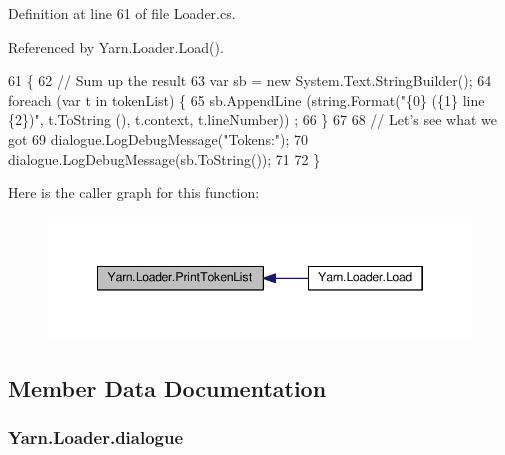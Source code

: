 Definition at line 61 of file Loader.\-cs.



Referenced by Yarn.\-Loader.\-Load().


\begin{DoxyCode}
61                                                           \{
62             \textcolor{comment}{// Sum up the result}
63             var sb = \textcolor{keyword}{new} System.Text.StringBuilder();
64             \textcolor{keywordflow}{foreach} (var t \textcolor{keywordflow}{in} tokenList) \{
65                 sb.AppendLine (string.Format(\textcolor{stringliteral}{"\{0\} (\{1\} line \{2\})"}, t.ToString (), t.context, t.lineNumber))
      ;
66             \}
67 
68             \textcolor{comment}{// Let's see what we got}
69             dialogue.LogDebugMessage(\textcolor{stringliteral}{"Tokens:"});
70             dialogue.LogDebugMessage(sb.ToString());
71 
72         \}
\end{DoxyCode}


Here is the caller graph for this function\-:
\nopagebreak
\begin{figure}[H]
\begin{center}
\leavevmode
\includegraphics[width=346pt]{a00127_a9321fce224021841ce6f70ca7fbe531b_icgraph}
\end{center}
\end{figure}




\subsection{Member Data Documentation}
\hypertarget{a00127_a89d1f29eba1c52c96c62a4cfe7859a1d}{
\subsubsection[{dialogue}]{ Yarn.\-Loader.\-dialogue\hspace{0.3cm}{\ttfamily [private]}}}\label{a00127_a89d1f29eba1c52c96c62a4cfe7859a1d}


